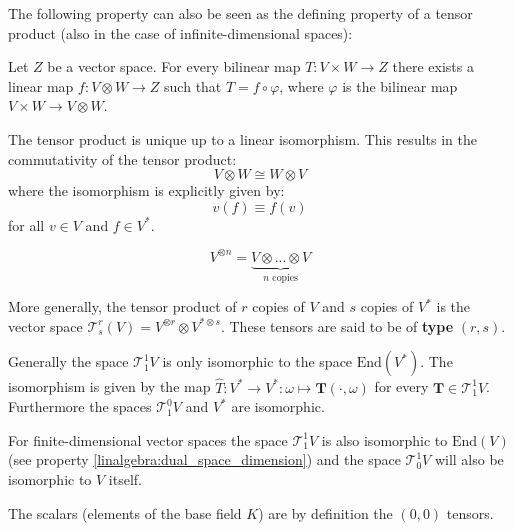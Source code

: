     
	The following property can also be seen as the defining property of a tensor product (also in the case of infinite-dimensional spaces):
	\begin{uproperty}\label{tensor:prop:universal_property}
	   	Let $Z$ be a vector space. For every bilinear map $T:V\times W\rightarrow Z$ there exists a linear map $f:V\otimes W\rightarrow Z$ such that $T = f\circ\varphi$, where $\varphi$ is the bilinear map $V\times W\rightarrow V\otimes W$.
	\end{uproperty}
	\begin{result}
	    	The tensor product is unique up to a linear isomorphism. This results in the commutativity of the tensor product:
	    	\begin{equation}
			\label{tensor:prop:change}
	        	V\otimes W \cong W\otimes V
		\end{equation}
		where the isomorphism is explicitly given by:
	        \begin{equation}
	        	v(f) \equiv f(v)
	        \end{equation}
	        for all $v\in V$ and $f\in V^*$.
	\end{result}
    
	\begin{notation}
	    	\begin{equation}
	    		V^{\otimes n} = \underbrace{V\otimes...\otimes V}_{n\text{ copies}}
	    	\end{equation}
	\end{notation}
	\begin{remark}
	    	More generally, the tensor product of $r$ copies of $V$ and $s$ copies of $V^*$ is the vector space $\mathcal{T}^r_s(V) = V^{\otimes r}\otimes V^{*\otimes s}$. These tensors are said to be of \textbf{type} $(r, s)$.
	\end{remark}
	
	\begin{remark}
		Generally the space $\mathcal{T}^1_1V$ is only isomorphic to the space $\text{End}(V^*)$. The isomorphism is given by the map $\hat{T}:V^*\rightarrow V^*:\omega\mapsto\mathbf{T}(\cdot, \omega)$ for every $\mathbf{T}\in\mathcal{T}^1_1V$. Furthermore the spaces $\mathcal{T}^0_1V$ and $V^*$ are isomorphic.
		
		For finite-dimensional vector spaces the space $\mathcal{T}^1_1V$ is also isomorphic to $\text{End}(V)$ (see property \ref{linalgebra:dual_space_dimension}) and the space $\mathcal{T}^1_0V$ will also be isomorphic to $V$ itself.
	\end{remark}
	\begin{definition}
	    	The scalars (elements of the base field $K$) are by definition the $(0,0)$ tensors.
	\end{definition}

